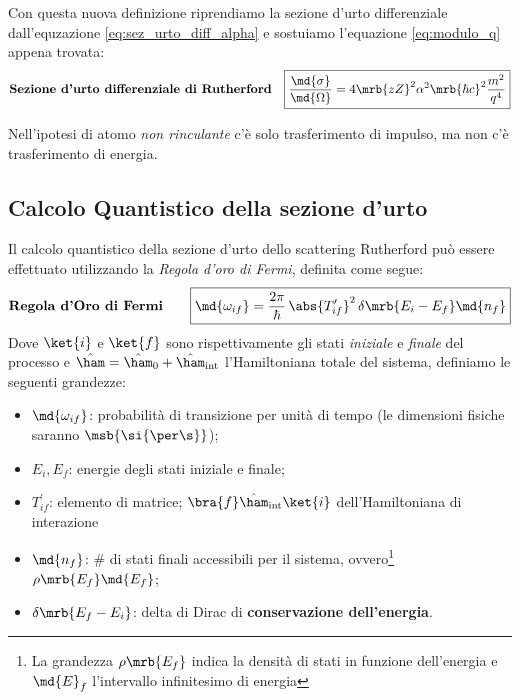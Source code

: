 Con questa nuova definizione riprendiamo la sezione d'urto differenziale
dall'equzazione \ref{eq:sez_urto_diff_alpha} e sostuiamo l'equazione
\ref{eq:modulo_q} appena trovata:
\begin{align}
  \textbf{Sezione d'urto differenziale di Rutherford} &&
  \boxed{
    \frac{\md{\sigma}}{\md{\Omega}} = 4\mrb{zZ}^2 \alpha^2 \mrb{\hbar c}^2
    \frac{m^2}{q^4}
  }
  \label{eq:sezione_urto_differenziale_rutherford}
\end{align}

\begin{note}[]
  Nell'ipotesi di atomo \textit{non rinculante} c'è solo trasferimento di
  impulso, ma non c'è trasferimento di energia.
\end{note}

\subsection{Calcolo Quantistico della sezione d'urto}
Il calcolo quantistico della sezione d'urto dello scattering Rutherford può
essere effettuato utilizzando la \textit{Regola d'oro di Fermi}, definita come
segue:
\begin{align}
  \textbf{Regola d'Oro di Fermi} \qquad
  \boxed{
    \md{\omega_{if}} = \frac{2\pi}{\hbar} \, \abs{T_{if}^\prime}^2 \,
    \delta\mrb{E_i-E_f} \md{n_f}
  }
  \label{eq:regola_oro_fermi}
\end{align}
Dove $\ket{i}$ e $\ket{f}$ sono rispettivamente gli stati \textit{iniziale} e
\textit{finale} del processo e $\hat{\ham} = \hat{\ham}_{0} +
\hat{\ham}_{\text{int}}$ l'Hamiltoniana totale del sistema, definiamo le
seguenti grandezze:
\begin{itemize}
  \item $\md{\omega_{if}}$: probabilità di transizione per unità di tempo (le
    dimensioni fisiche saranno $\msb{\si{\per \s}}$);
  \item $E_i,E_f$: energie degli stati iniziale e finale;
  \item $T_{if}^\prime$: elemento di matrice;
    $\bra{f}\hat{\ham}_{\text{int}}\ket{i}$ dell'Hamiltoniana di interazione
  \item $\md{n_f}$: \# di stati finali accessibili per il sistema,
    ovvero\footnote{
      La grandezza $\rho\mrb{E_f}$ indica la densità di stati in funzione
      dell'energia e $\md{E}_{f}$ l'intervallo infinitesimo di energia
    } $\rho\mrb{E_f} \md{E_f}$;
  \item $\delta\mrb{E_f - E_i}$: delta di Dirac di \textbf{conservazione
    dell'energia}.
\end{itemize}

